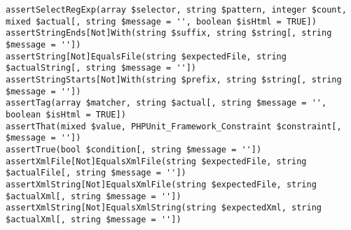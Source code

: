 \documentclass[a4paper,twoside,landscape]{scrartcl}
\begin{document}
\begin{verbatim}
assertSelectRegExp(array $selector, string $pattern, integer $count, mixed $actual[, string $message = '', boolean $isHtml = TRUE])
assertStringEnds[Not]With(string $suffix, string $string[, string $message = ''])
assertString[Not]EqualsFile(string $expectedFile, string $actualString[, string $message = ''])
assertStringStarts[Not]With(string $prefix, string $string[, string $message = ''])
assertTag(array $matcher, string $actual[, string $message = '', boolean $isHtml = TRUE])
assertThat(mixed $value, PHPUnit_Framework_Constraint $constraint[, $message = ''])
assertTrue(bool $condition[, string $message = ''])
assertXmlFile[Not]EqualsXmlFile(string $expectedFile, string $actualFile[, string $message = ''])
assertXmlString[Not]EqualsXmlFile(string $expectedFile, string $actualXml[, string $message = ''])
assertXmlString[Not]EqualsXmlString(string $expectedXml, string $actualXml[, string $message = ''])
\end{verbatim}
\normalsize
\end{document}
